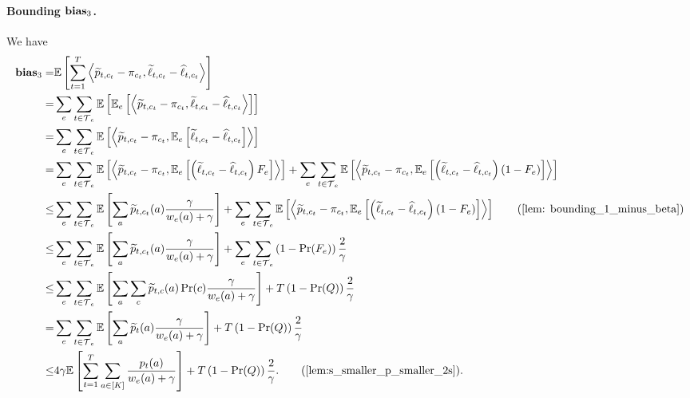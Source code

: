 \paragraph{Bounding $\mathbf{bias}_{3}$.} We have
\begin{align*}
    \bias{3}   =&\E\left[\sum_{t=1}^T \ip{\widetilde{p}_{t, c_t}-\pi_{c_t}, \widetilde{\ell}_{t, c_t}-\widehat{\ell}_{t, c_t}}\right]\\
    =&\sum_e \sum_{t \in \Time_e} \E\left[\E_e\left[ \ip{\widetilde{p}_{t, c_t}-\pi_{c_t}, \widetilde{\ell}_{t, c_t}-\widehat{\ell}_{t, c_t}}\right]\right]\\
    =&\sum_e \sum_{t \in \Time_e} \E\left[ \ip{\widetilde{p}_{t, c_t}-\pi_{c_t}, \E_e\left[\widetilde{\ell}_{t, c_t}-\widehat{\ell}_{t, c_t} \right]}\right]\\
%
    =& \sum_e \sum_{t \in \Time_e} \E\left[ \ip{\widetilde{p}_{t, c_t}-\pi_{c_t}, \E_e\left[\left(\widetilde{\ell}_{t, c_t}-\widehat{\ell}_{t, c_t} \right)F_e\right]}\right] + \sum_e \sum_{t \in \Time_e} \E\left[ \ip{\widetilde{p}_{t, c_t}-\pi_{c_t}, \E_e\left[\left(\widetilde{\ell}_{t, c_t}-\widehat{\ell}_{t, c_t} \right) (1 - F_e)\right]}\right] \\
%
    \le& \sum_e \sum_{t \in \Time_e} \E\left[ \sum_a \widetilde{p}_{t,c_t}(a) \frac{\gamma}{w_e(a) + \gamma} \right] + \sum_e \sum_{t \in \Time_e} \E\left[ \ip{\widetilde{p}_{t, c_t}-\pi_{c_t}, \E_e\left[\left(\widetilde{\ell}_{t, c_t}-\widehat{\ell}_{t, c_t} \right) (1 - F_e)\right]}\right] \tag{\Cref{lem: bounding_1_minus_beta}}\\
%
    \le& \sum_e \sum_{t \in \Time_e} \E\left[ \sum_a \widetilde{p}_{t,c_t}(a) \frac{\gamma}{w_e(a) + \gamma} \right] + \sum_e \sum_{t \in \Time_e} \left(1 - \Pr(F_e)\right) \frac{2}{\gamma}  \\
%
    \le& \sum_e \sum_{t \in \Time_e} \E\left[ \sum_a \sum_c \widetilde{p}_{t,c}(a) \Pr(c) \frac{\gamma}{w_e(a) + \gamma} \right] + T \left(1 - \Pr(Q)\right) \frac{2}{\gamma} \\
%
    =& \sum_e \sum_{t \in \Time_e} \E\left[ \sum_a \widetilde{p}_t(a)  \frac{\gamma}{w_e(a) + \gamma} \right] + T \left(1 - \Pr(Q)\right) \frac{2}{\gamma} \\
%
    \le& 4 \gamma \E\left[\sum_{t=1}^T\sum_{a\in[K]} \frac{p_t(a)}{w_e(a)+ \gamma} \right] + T \left(1 - \Pr(Q)\right) \frac{2}{\gamma}. \tag{\Cref{lem:s_smaller_p_smaller_2s}}.
\end{align*}


